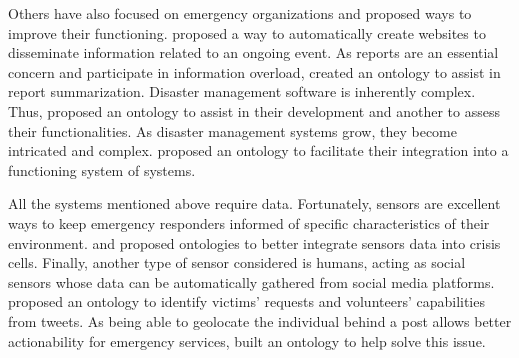 Others have also focused on emergency organizations and proposed ways to improve their functioning.
\textcite{chouOntologyDevelopingWeb2011} proposed a way to automatically create websites to disseminate information related to an ongoing event.
As reports are an essential concern and participate in information overload, \textcite{liOntologyenrichedMultiDocumentSummarization2010} created an ontology to assist in report summarization.
Disaster management software is inherently complex. Thus, \textcite{babitskiSoKNOSUsingSemantic2011} proposed an ontology to assist in their development and another to assess their functionalities.
As disaster management systems grow, they become intricated and complex. \textcite{madniSystemsIntegrationKey2014} proposed an ontology to facilitate their integration into a functioning system of systems.

All the systems mentioned above require data.
Fortunately, sensors are excellent ways to keep emergency responders informed of specific characteristics of their environment.
\textcite{posladSemanticIoTEarly2015} and \textcite{babitskiOntologybasedIntegrationSensor2009} proposed ontologies to better integrate sensors data into crisis cells.
Finally, another type of sensor considered is humans, acting as social sensors whose data can be automatically gathered from social media platforms.
\textcite{purohitIdentifyingSeekersSuppliers2014} proposed an ontology to identify victims' requests and volunteers' capabilities from tweets.
As being able to geolocate the individual behind a post allows better actionability for emergency services, \textcite{ghahremanlouGeotaggingTwitterMessages2014} built an ontology to help solve this issue.

